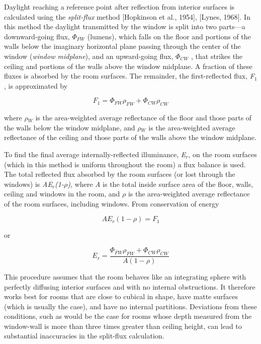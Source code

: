 Daylight reaching a reference point after reflection from interior surfaces is calculated using the \emph{split-flux} method {[}Hopkinson et al., 1954{]}, {[}Lynes, 1968{]}. In this method the daylight transmitted by the window is split into two parts---a downward-going flux, \({\Phi_{FW}}\) (lumens), which falls on the floor and portions of the walls below the imaginary horizontal plane passing through the center of the window (\emph{window midplane}), and an upward-going flux, \({\Phi_{CW}}\) , that strikes the ceiling and portions of the walls above the window midplane. A fraction of these fluxes is absorbed by the room surfaces. The remainder, the first-reflected flux, \emph{F\(_{1}\)}, is approximated by

\begin{equation}
{F_1} = {\Phi_{FW}}{\rho_{FW}} + {\Phi_{CW}}{\rho_{CW}}
\end{equation}

where \emph{$\rho$\(_{W}\)} is the area-weighted average reflectance of the floor and those parts of the walls below the window midplane, and \emph{$\rho$\(_{W}\)} is the area-weighted average reflectance of the ceiling and those parts of the walls above the window midplane.

To find the final average internally-reflected illuminance, \emph{E\(_{r}\)}, on the room surfaces (which in this method is uniform throughout the room) a flux balance is used. The total reflected flux absorbed by the room surfaces (or lost through the windows) is \emph{AE\(_{r}\)(1-$\rho$)}, where \emph{A} is the total inside surface area of the floor, walls, ceiling and windows in the room, and \emph{$\rho$} is the area-weighted average reflectance of the room surfaces, including windows. From conservation of energy

\begin{equation}
A{E_r}(1 - \rho ) = {F_1}
\end{equation}

or

\begin{equation}
{E_r} = \frac{{{\Phi_{FW}}{\rho_{FW}} + {\Phi_{CW}}{\rho_{CW}}}}{{A(1 - \rho )}}
\end{equation}

This procedure assumes that the room behaves like an integrating sphere with perfectly diffusing interior surfaces and with no internal obstructions. It therefore works best for rooms that are close to cubical in shape, have matte surfaces (which is usually the case), and have no internal partitions. Deviations from these conditions, such as would be the case for rooms whose depth measured from the window-wall is more than three times greater than ceiling height, can lead to substantial inaccuracies in the split-flux calculation.

